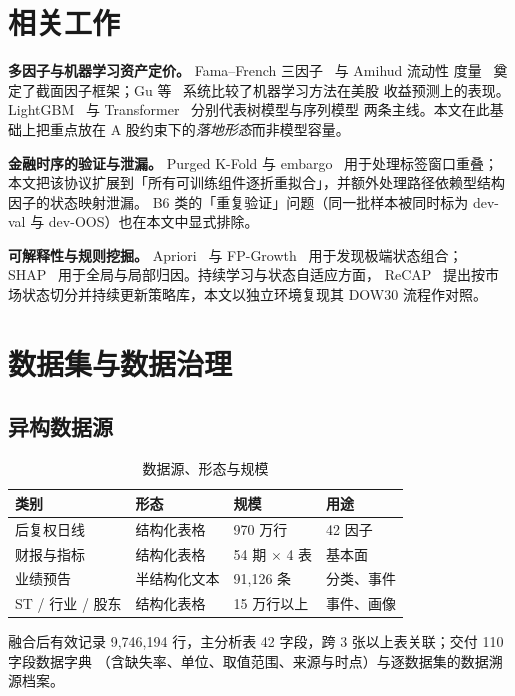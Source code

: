 \documentclass[sigconf]{acmart}
\begin{document}
\section{相关工作}

\textbf{多因子与机器学习资产定价。} Fama--French 三因子~\cite{fama1993} 与 Amihud 流动性
度量~\cite{amihud2002} 奠定了截面因子框架；Gu 等~\cite{gu2020} 系统比较了机器学习方法在美股
收益预测上的表现。LightGBM~\cite{ke2017} 与 Transformer~\cite{vaswani2017} 分别代表树模型与序列模型
两条主线。本文在此基础上把重点放在 A 股约束下的\emph{落地形态}而非模型容量。

\textbf{金融时序的验证与泄漏。} Purged K-Fold 与 embargo~\cite{lopez2018} 用于处理标签窗口重叠；
本文把该协议扩展到「所有可训练组件逐折重拟合」，并额外处理路径依赖型结构因子的状态映射泄漏。
B6 类的「重复验证」问题（同一批样本被同时标为 dev-val 与 dev-OOS）也在本文中显式排除。

\textbf{可解释性与规则挖掘。} Apriori~\cite{agrawal1994} 与 FP-Growth~\cite{han2000} 用于发现极端状态组合；
SHAP~\cite{lundberg2017} 用于全局与局部归因。持续学习与状态自适应方面，
ReCAP~\cite{pan2026} 提出按市场状态切分并持续更新策略库，本文以独立环境复现其 DOW30 流程作对照。

\section{数据集与数据治理}

\subsection{异构数据源}

\begin{table}[t]
\caption{数据源、形态与规模}
\label{tab:data}
\small
\begin{tabular}{p{2.2cm}p{2.3cm}p{2.0cm}p{1.5cm}}
\toprule
类别 & 形态 & 规模 & 用途 \\
\midrule
后复权日线 & 结构化表格 & 970 万行 & 42 因子 \\
财报与指标 & 结构化表格 & 54 期 $\times$ 4 表 & 基本面 \\
业绩预告 & 半结构化文本 & 91{,}126 条 & 分类、事件 \\
ST / 行业 / 股东 & 结构化表格 & 15 万行以上 & 事件、画像 \\
\bottomrule
\end{tabular}
\end{table}

融合后有效记录 9{,}746{,}194 行，主分析表 42 字段，跨 3 张以上表关联；交付 110 字段数据字典
（含缺失率、单位、取值范围、来源与时点）与逐数据集的数据溯源档案。
\end{document}
